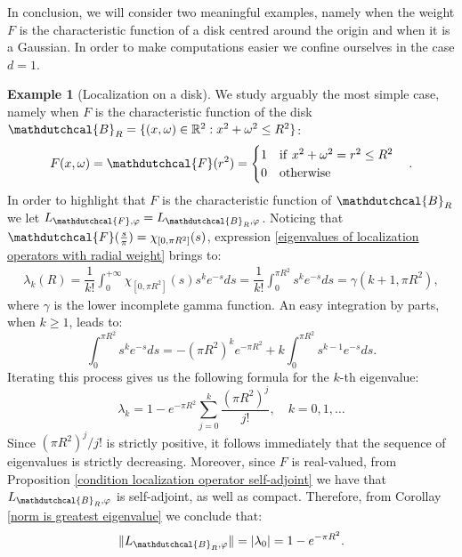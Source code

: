 \documentclass[corpo=11pt, stile=classica, tipotesi=custom,
greek, evenboxes, english]{toptesi}
\numberwithin{equation}{chapter}
\theoremstyle{definition}
\newtheorem{es}[teo]{Example}
\theoremstyle{remark}
\newcommand{\R}{\mathbb{R}} %
\begin{document}
In conclusion, we will consider two meaningful examples, namely when the weight $F$ is the characteristic function of a disk centred around the origin and when it is a Gaussian. In order to make computations easier we confine ourselves in the case $d=1$.
\begin{es}[Localization on a disk]\label{example localization on a disk}
	We study arguably the most simple case, namely when $F$ is the characteristic function of the disk $\mathdutchcal{B}_R = \{(x,\omega) \in \R^2 : x^2 + \omega^2 \leq R^2\}$:
	\begin{equation*}
			F(x,\omega) = \mathdutchcal{F}(r^2) = \begin{cases}
				1 \quad \mathrm{if\ } x^2 + \omega^2 = r^2 \leq R^2\\
				0 \quad \mathrm{otherwise}
			\end{cases} .
	\end{equation*}
	In order to highlight that $F$ is the characteristic function of $\mathdutchcal{B}_R$ we let $L_{\mathdutchcal{F},\varphi} = L_{\mathdutchcal{B}_R,\varphi}$. Noticing that $\mathdutchcal{F}(\frac{s}{\pi}) = \chi_{[0,\pi R^2]} (s)$, expression \eqref{eigenvalues of localization operators with radial weight} brings to:
	\begin{align*}
		\lambda_k(R) = \dfrac{1}{k!} \int_{0}^{+\infty} \chi_{[0,\pi R^2]}(s) s^k e^{-s} ds = \dfrac{1}{k!} \int_{0}^{\pi R^2} s^k e^{-s} ds = \gamma(k+1,\pi R^2),
	\end{align*}
	where $\gamma$ is the lower incomplete gamma function. An easy integration by parts, when $k \geq 1$, leads to:
	\begin{equation*}
		\int_{0}^{\pi R^2} s^k e^{-s} ds = -(\pi R^2)^k e^{-\pi R^2} + k \int_{0}^{\pi R^2} s^{k-1} e^{-s} ds.
	\end{equation*}
	Iterating this process gives us the following formula for the $k$-th eigenvalue:
	\begin{equation*}
		\lambda_k = 1 - e^{-\pi R^2} \sum_{j=0}^{k} \dfrac{(\pi R^2)^j}{j!}, \quad k=0,1,\ldots
	\end{equation*}
	Since $(\pi R^2)^j/j!$ is strictly positive, it follows immediately that the sequence of eigenvalues is strictly decreasing. Moreover, since $F$ is real-valued, from Proposition \ref{condition localization operator self-adjoint} we have that $L_{\mathdutchcal{B}_R,\varphi}$ is self-adjoint, as well as compact. Therefore, from Corollay \ref{norm is greatest eigenvalue} we conclude that:
	\begin{equation*}
		\| L_{\mathdutchcal{B}_R,\varphi} \| = |\lambda_0| = 1 - e^{-\pi R^2}.

\end{equation*}
\end{es}
\end{document}
